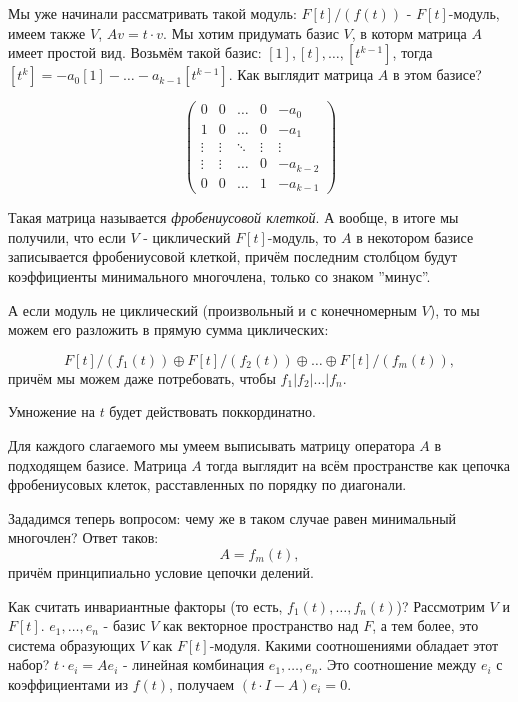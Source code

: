 \documentclass[a4paper,100pt]{article}
\theoremstyle{indented}
\theoremstyle{definition}
\theoremstyle{remark}
\begin{document}
Мы уже начинали рассматривать такой модуль: $F[t]/(f(t))$ - $F[t]$-модуль, имеем также $V$, $Av=t\cdot v$. Мы хотим придумать базис $V$, в которм матрица $A$ имеет простой вид. Возьмём такой базис: $[1], [t], \ldots, [t^{k-1}]$, тогда $[t^k]=-a_0[1]-\ldots-a_{k-1}[t^{k-1}]$. Как выглядит матрица $A$ в этом базисе?

\begin{equation*}
    \begin{pmatrix}
        0 & 0 & \dots & 0 & -a_0\\
        1 & 0& \dots & 0 & -a_1\\
        \vdots & \vdots &\ddots & \vdots  & \vdots  \\
        \vdots & \vdots & \dots & 0 & -a_{k-2}\\
        0 & 0 & \dots & 1 & -a_{k-1}
    \end{pmatrix}
\end{equation*}

Такая матрица называется \textit{фробениусовой клеткой}. А вообще, в итоге мы получили, что если $V$ - циклический $F[t]$-модуль, то $A$ в некотором базисе записывается фробениусовой клеткой, причём последним столбцом будут коэффициенты минимального многочлена, только со знаком ''минус''.\ 

А если модуль не циклический (произвольный и с конечномерным $V$), то мы можем его разложить в прямую сумма циклических: 

\[
    F[t]/(f_1(t))\oplus F[t]/(f_2(t))\oplus\ldots\oplus F[t]/(f_m(t)), 
\]
причём мы можем даже потребовать, чтобы $f_1\vert f_2\vert\ldots\vert f_n$. \ 

Умножение на $t$ будет действовать поккординатно. \ 

Для каждого слагаемого мы умеем выписывать матрицу оператора $A$ в подходящем базисе. Матрица $A$ тогда выглядит на всём пространстве как цепочка фробениусовых клеток, расставленных по порядку по диагонали.\ 

Зададимся теперь вопросом: чему же в таком случае равен минимальный многочлен? Ответ таков:
\[
    A=f_m(t),
\]
причём принципиально условие цепочки делений. \

Как считать инвариантные факторы (то есть, $f_1(t), \ldots,f_n(t)$)? Рассмотрим $V$ и $F[t]$. $e_1, \ldots, e_n$ - базис $V$ как векторное пространство над $F$, а тем более, это система образующих $V$ как $F[t]$-модуля. Какими соотношениями обладает этот набор? $t\cdot e_i=Ae_i$ - линейная комбинация $e_1, \ldots, e_n$. Это соотношение между $e_i$ с коэффициентами из $f(t)$, получаем $(t\cdot I-A)e_i=0$.\ 
\end{document}
